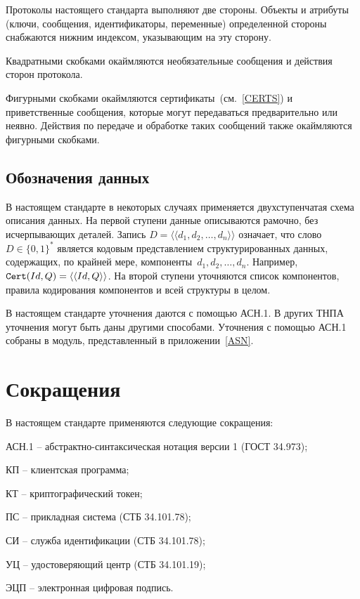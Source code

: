 Протоколы настоящего стандарта выполняют две стороны.
Объекты и атрибуты (ключи, сообщения, идентификаторы, переменные)
определенной стороны снабжаются нижним индексом,
указывающим на эту сторону.

Квадратными скобками окаймляются 
необязательные сообщения и действия сторон протокола.

Фигурными скобками окаймляются сертификаты~(см.~\ref{CERTS})
и приветственные сообщения,
которые могут передаваться предварительно или неявно. 
Действия по передаче и обработке таких сообщений
также окаймляются фигурными скобками.

\subsection{Обозначения данных}

В настоящем стандарте в некоторых случаях применяется двухступенчатая 
схема описания данных. На первой ступени данные описываются рамочно, без 
исчерпывающих деталей. Запись $D = \langle\langle d_1, d_2,\ldots, d_n\rangle\rangle$ 
означает, что слово $D \in\{0,1\}^*$ является кодовым представлением 
структурированных данных, содержащих, по крайней мере, 
компоненты~$d_1, d_2,\ldots, d_n$. 
%
Например, $\texttt{Cert}(Id,Q)=\langle\langle Id,Q\rangle\rangle$.
%
На второй ступени  уточняются список компонентов, правила кодирования
компонентов и всей структуры в целом.

В настоящем стандарте уточнения даются с помощью АСН.1.
В других ТНПА уточнения могут быть даны другими способами.
Уточнения с помощью АСН.1 собраны в модуль, представленный 
в приложении~\ref{ASN}. 

\section{Сокращения}

В настоящем стандарте применяются следующие сокращения:

АСН.1 -- абстрактно-синтаксическая нотация версии 1 (ГОСТ 34.973);

КП -- клиентская программа;

КТ -- криптографический токен;

ПС -- прикладная система (СТБ 34.101.78);

СИ -- служба идентификации (СТБ 34.101.78);

УЦ -- удостоверяющий центр (СТБ 34.101.19);

ЭЦП -- электронная цифровая подпись.


